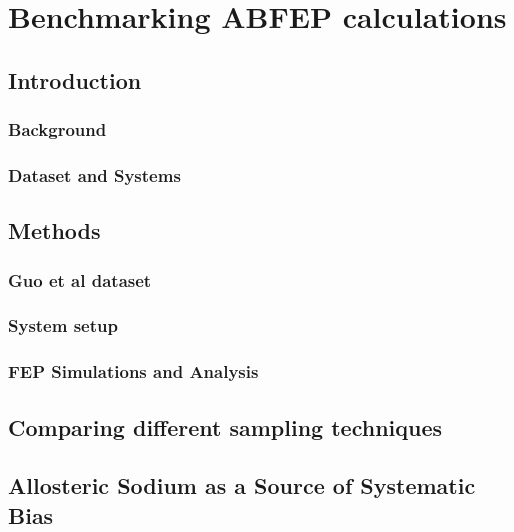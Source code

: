 \chapter{Benchmarking ABFEP calculations}
\label{ch:benchmarking-and-system-preparation}
\section{Introduction}

\lipsum[1][1-3]

\subsection{Background}

\lipsum[1][1-3]

\subsection{Dataset and Systems}

\lipsum[1][1-3]

\section{Methods}

\lipsum[1][1-3]

\subsection{Guo et al dataset}

\lipsum[1][1-3]

\subsection{System setup}

\lipsum[1][1-3]

\subsection{FEP Simulations and Analysis}

\lipsum[1][1-3]

\section{Comparing different sampling techniques}

\lipsum[1][1-3]

\section{Allosteric Sodium as a Source of Systematic Bias}

